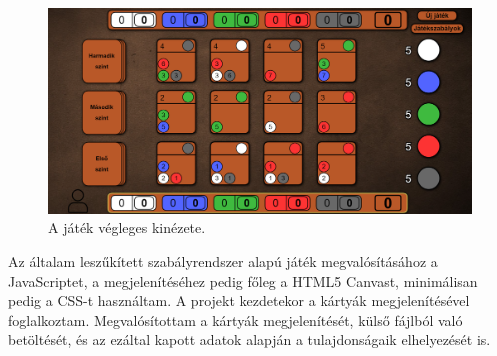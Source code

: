 \begin{figure}[h]
\centering
\includegraphics[scale=0.3]{images/screen_structure.png}
\caption{A játék végleges kinézete.}
\label{fig:screen_structure}
\end{figure}



Az általam leszűkített szabályrendszer alapú játék megvalósításához a JavaScriptet, a megjelenítéséhez pedig főleg a HTML5 Canvast, minimálisan pedig a CSS-t használtam. A projekt kezdetekor a kártyák megjelenítésével foglalkoztam. Megvalósítottam a kártyák megjelenítését, külső fájlból való betöltését, és az ezáltal kapott adatok alapján a tulajdonságaik elhelyezését is.

\newpage


